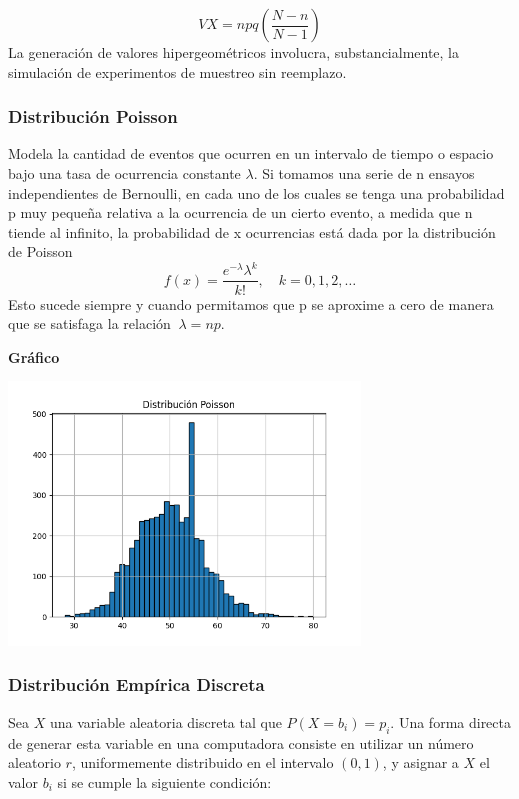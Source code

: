 \documentclass[11pt]{article}
\begin{document}
  \begin{equation}
    VX = npq(\frac{N-n}{N-1})
    \end{equation}
  La generación de valores hipergeométricos involucra, substancialmente, la simulación de experimentos de muestreo sin reemplazo.


\subsubsection{Distribución Poisson}
Modela la cantidad de eventos que ocurren en un intervalo de tiempo o espacio bajo una tasa de ocurrencia constante \( \lambda \).
 Si tomamos una serie de n ensayos independientes de Bernoulli, en cada uno de los cuales se tenga una probabilidad p muy pequeña relativa a la ocurrencia de un cierto evento,
  a medida que n tiende al infinito, la probabilidad de x ocurrencias está dada por la distribución de Poisson
  \begin{equation}
    f(x) = \frac{e^{-\lambda} \lambda^k}{k!}, \quad k = 0, 1, 2, \ldots
    \end{equation}
Esto sucede siempre y cuando permitamos que p se aproxime a cero de manera que se satisfaga la relación \(\ \lambda = np. \)\

\noindent\textbf{Gráfico\newline}
\begin{center}
\includegraphics[width=0.7\textwidth]{Images/histograma_poisson.png}
\end{center}

\subsubsection{Distribución Empírica Discreta}
Sea \( X \) una variable aleatoria discreta tal que \( P(X = b_i) = p_i \).  
Una forma directa de generar esta variable en una computadora consiste en utilizar un número aleatorio \( r \), uniformemente distribuido en el intervalo \( (0, 1) \), y asignar a \( X \) el valor \( b_i \) si se cumple la siguiente condición:
\end{document}
